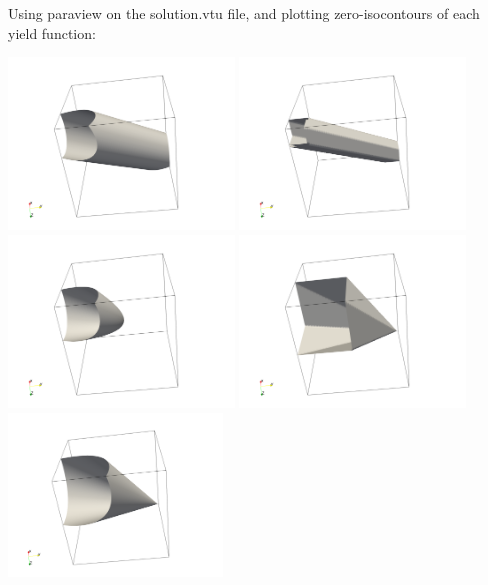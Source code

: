 Using paraview on the {solution.vtu} file, and plotting zero-isocontours of each yield function:
\begin{center}
\includegraphics[width=6cm]{python_codes/fieldstone_159/images/VM}
\includegraphics[width=6cm]{python_codes/fieldstone_159/images/TR}\\
\includegraphics[width=6cm]{python_codes/fieldstone_159/images/GM}
\includegraphics[width=6cm]{python_codes/fieldstone_159/images/MC}\\
\includegraphics[width=5.7cm]{python_codes/fieldstone_159/images/DPi}

\end{center}
